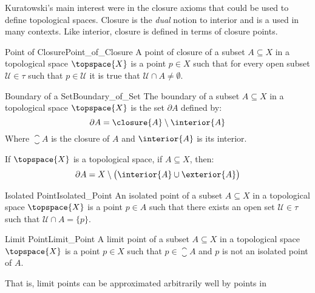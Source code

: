 \documentclass{article}                                                        %
\begin{document}
        Kuratowski's main interest were in the closure axioms that could be used
        to define topological spaces. Closure is the \textit{dual} notion to
        interior and is a used in many contexts. Like interior, closure is
        defined in terms of closure points.
        \begin{fdefinition}{Point of Closure}{Point_of_Closure}
            A point of closure of a subset $A\subseteq{X}$ in a topological
            space $\topspace{X}$ is a point $p\in{X}$ such that for every open
            subset $\mathcal{U}\in\tau$ such that $p\in\mathcal{U}$ it is true
            that $\mathcal{U}\cap{A}\ne\emptyset$.
        \end{fdefinition}
        \begin{fdefinition}{Boundary of a Set}{Boundary_of_Set}
            The boundary of a subset $A\subseteq{X}$ in a topological space
            $\topspace{X}$ is the set $\partial{A}$ defined by:
            \begin{equation*}
                \partial{A}=\closure{A}\setminus\interior{A}
            \end{equation*}
            Where $\closure{A}$ is the closure of $A$ and $\interior{A}$ is its
            interior.
        \end{fdefinition}
        \begin{theorem}
            If $\topspace{X}$ is a topological space, if $A\subseteq{X}$, then:
            \begin{equation}
                \partial{A}=X\setminus\big(\interior{A}\cup\exterior{A}\big)
            \end{equation}
        \end{theorem}
        \begin{fdefinition}{Isolated Point}{Isolated_Point}
            An isolated point of a subset $A\subseteq{X}$ in a topological space
            $\topspace{X}$ is a point $p\in{A}$ such that there exists an
            open set $\mathcal{U}\in\tau$ such that $\mathcal{U}\cap{A}=\{p\}$.
        \end{fdefinition}
        \begin{fdefinition}{Limit Point}{Limit_Point}
            A limit point of a subset $A\subseteq{X}$ in a topological space
            $\topspace{X}$ is a point $p\in{X}$ such that
            $p\in\closure{A}$ and $p$ is not an isolated point of $A$.
        \end{fdefinition}
        That is, limit points can be approximated arbitrarily well by points in
\end{document}
